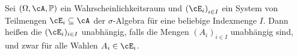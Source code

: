 \begin{deff}\label{Ka}
	Sei $(\Omega, \cA, \mathbb{P})$ ein Wahrscheinlichkeitsraum und ${(\cE_i)}_{i \in I}$ ein System von Teilmengen $\cE_i \subseteq \cA$ der $\sigma$-Algebra f\"ur eine beliebige Indexmenge $I$. Dann heißen die $(\cE_i)_{i\in I}$ unabhängig, falls die Mengen ${(A_i)}_{i \in I}$ unabhängig sind, und zwar f\"ur alle Wahlen $A_i \in \cE_i$.
\end{deff}
